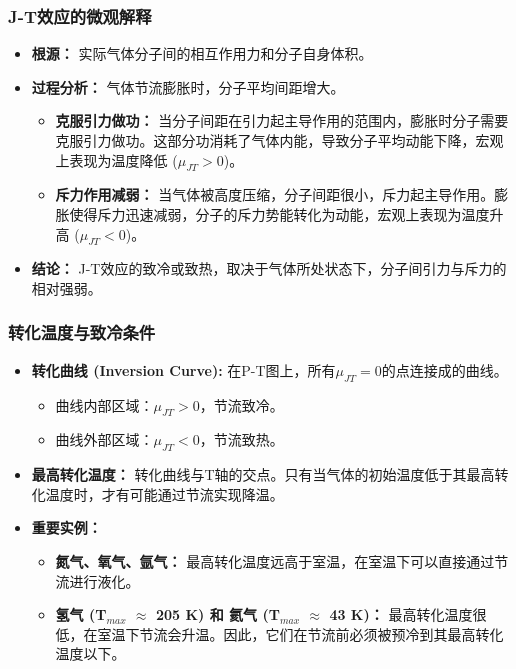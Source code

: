 \documentclass{beamer}
\begin{document}
\begin{frame}
    \frametitle{J-T效应的微观解释}
    \begin{itemize}
        \item \textbf{根源：} 实际气体分子间的\alert{相互作用力}和\alert{分子自身体积}。
        \vfill
        \item \textbf{过程分析：} 气体节流膨胀时，分子平均间距增大。
        \begin{itemize}
            \item<2-> \textbf{克服引力做功：} 当分子间距在\alert{引力}起主导作用的范围内，膨胀时分子需要克服引力做功。这部分功消耗了气体内能，导致分子平均动能下降，宏观上表现为\alert{温度降低} ($\mu_{JT}>0$)。
            \vfill
            \item<3-> \textbf{斥力作用减弱：} 当气体被高度压缩，分子间距很小，\alert{斥力}起主导作用。膨胀使得斥力迅速减弱，分子的斥力势能转化为动能，宏观上表现为\alert{温度升高} ($\mu_{JT}<0$)。
        \end{itemize}
        \vfill
        \item<4-> \textbf{结论：} J-T效应的致冷或致热，取决于气体所处状态下，分子间\alert{引力与斥力的相对强弱}。
    \end{itemize}
\end{frame}

\begin{frame}
    \frametitle{转化温度与致冷条件}
    \begin{itemize}
        \item \textbf{转化曲线 (Inversion Curve):} 在P-T图上，所有$\mu_{JT}=0$的点连接成的曲线。
        \begin{itemize}
            \item 曲线内部区域：$\mu_{JT} > 0$，节流致冷。
            \item 曲线外部区域：$\mu_{JT} < 0$，节流致热。
        \end{itemize}
        \vfill
        \item \textbf{最高转化温度：} 转化曲线与T轴的交点。只有当气体的初始温度\alert{低于其最高转化温度}时，才有可能通过节流实现降温。
        \vfill
        \item \textbf{重要实例：}
        \begin{itemize}
            \item \textbf{氮气、氧气、氩气：} 最高转化温度远高于室温，在室温下可以直接通过节流进行液化。
            \item \textbf{\alert{氢气} (T$_{max}$ $\approx$ 205 K) 和 \alert{氦气} (T$_{max}$ $\approx$ 43 K)：} 最高转化温度很低，在室温下节流会\alert{升温}。因此，它们在节流前必须被\alert{预冷}到其最高转化温度以下。
        \end{itemize}
    \end{itemize}
\end{frame}
\end{document}
